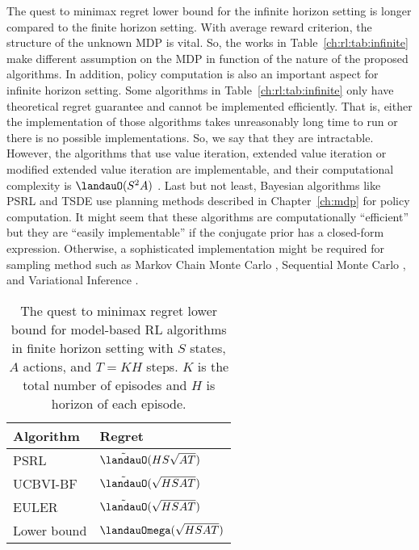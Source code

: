 The quest to minimax regret lower bound for the infinite horizon setting is longer compared to the finite horizon setting.
With average reward criterion, the structure of the unknown MDP is vital.
So, the works in Table~\ref{ch:rl:tab:infinite} make different assumption on the MDP in function of the nature of the proposed algorithms.
In addition, policy computation is also an important aspect for infinite horizon setting.
Some algorithms in Table~\ref{ch:rl:tab:infinite} only have theoretical regret guarantee and cannot be implemented efficiently.
That is, either the implementation of those algorithms takes unreasonably long time to run or there is no possible implementations.
So, we say that they are intractable.
However, the algorithms that use value iteration, extended value iteration or modified extended value iteration are implementable, and their computational complexity is $\landauO(S^2A)$ \cite{jaksch2010near}.
Last but not least, Bayesian algorithms like PSRL and TSDE use planning methods described in Chapter~\ref{ch:mdp} for policy computation.
It might seem that these algorithms are computationally ``efficient'' but they are ``easily implementable'' if the conjugate prior has a closed-form expression.
Otherwise, a sophisticated implementation might be required for sampling method such as Markov Chain Monte Carlo \cite{andrieu2003introduction}, Sequential Monte Carlo \cite{doucet2009tutorial}, and Variational Inference \cite{blei2017variational}.
\begin{table}[htbp]
    \centering
\begin{tabular}{|l|l|}
\hline
Algorithm & Regret \\ \hline
PSRL \cite{osband2013more}  & $\tilde{\landauO}(HS\sqrt{AT})$ \\ 
UCBVI-BF \cite{azar2017minimax}  & $\tilde{\landauO}(\sqrt{HSAT})$ \\ 
EULER \cite{zanette2019tighter}        & $\tilde{\landauO}(\sqrt{HSAT})$ \\ \hline
Lower bound & $\landauOmega(\sqrt{HSAT})$ \cite{jaksch2010near} \\ \hline
\end{tabular}
\caption{The quest to minimax regret lower bound for model-based RL algorithms in finite horizon setting with $S$ states, $A$ actions, and $T=KH$ steps.
$K$ is the total number of episodes and $H$ is horizon of each episode.
}
\label{ch:rl:tab:finite}
\end{table}

